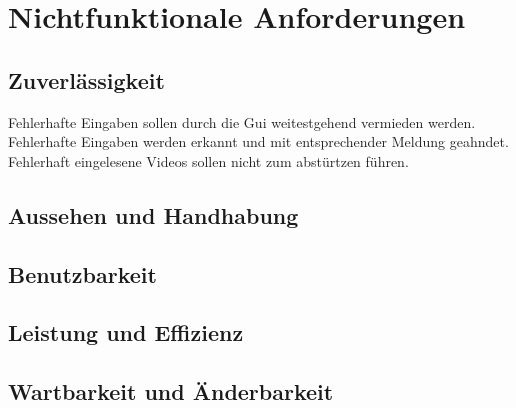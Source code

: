 \chapter{Nichtfunktionale Anforderungen}
\section{Zuverlässigkeit}
\setcounter{enumi}{0}
 Fehlerhafte Eingaben sollen durch die Gui weitestgehend vermieden werden.
 Fehlerhafte Eingaben werden erkannt und mit entsprechender Meldung geahndet.
 Fehlerhaft eingelesene Videos sollen nicht zum abstürtzen führen.
\section{Aussehen und Handhabung}
\section{Benutzbarkeit}
\section{Leistung und Effizienz}
\section{Wartbarkeit und Änderbarkeit}
